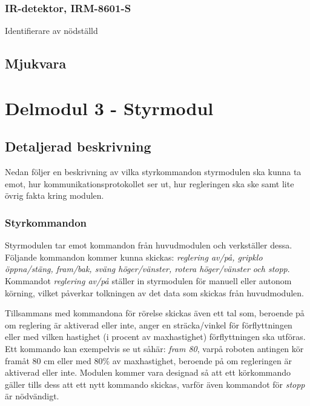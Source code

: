 \documentclass[11pt]{article}
\begin{document}
\begin{flushleft}
\subsubsection{IR-detektor, IRM-8601-S}
\item[Identifierare av nödställd] \hfill \\
	

\subsection{Mjukvara}
\lipsum

\pagebreak
\section{Delmodul 3 - Styrmodul}
\lipsum

\subsection{Detaljerad beskrivning}
Nedan följer en beskrivning av vilka styrkommandon styrmodulen ska kunna ta emot, hur kommunikationsprotokollet ser ut, hur regleringen ska ske samt lite övrig fakta kring modulen.

\subsubsection{Styrkommandon}\label{Styrkommandon}
Styrmodulen tar emot kommandon från huvudmodulen och verkställer dessa. Följande kommandon kommer kunna skickas: \textit{reglering av/på, gripklo öppna/stäng, fram/bak, sväng höger/vänster, rotera höger/vänster och stopp}. Kommandot \textit{reglering av/på} ställer in styrmodulen för manuell eller autonom körning, vilket påverkar tolkningen av det data som skickas från huvudmodulen.

Tillsammans med kommandona för rörelse skickas även ett tal som, beroende på om reglering är aktiverad eller inte, anger en sträcka/vinkel för förflyttningen eller med vilken hastighet (i procent av maxhastighet) förflyttningen ska utföras. Ett kommando kan exempelvis se ut såhär: \textit{fram 80}, varpå roboten antingen kör framåt 80 cm eller med 80\% av maxhastighet, beroende på om regleringen är aktiverad eller inte. Modulen kommer vara designad så att ett körkommando gäller tills dess att ett nytt kommando skickas, varför även kommandot för \textit{stopp} är nödvändigt.


\end{flushleft}
\end{document}
